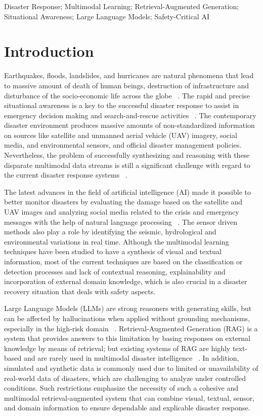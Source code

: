 \documentclass[conference]{IEEEtran}
\begin{document}
\begin{IEEEkeywords}
Disaster Response; Multimodal Learning; Retrieval-Augmented Generation; Situational Awareness; Large Language Models; Safety-Critical AI
\end{IEEEkeywords}

\section{Introduction}

Earthquakes, floods, landslides, and hurricanes are natural phenomena that lead to massive amount of death of human beings, destruction of infrastructure and disturbance of the socio-economic life across the globe ~\cite{b1}. The rapid and precise situational awareness is a key to the successful disaster response to assist in emergency decision making and search-and-rescue activities ~\cite{b2}. The contemporary disaster environment produces massive amounts of non-standardized information on sources like satellite and unmanned aerial vehicle (UAV) imagery, social media, and environmental sensors, and official disaster management policies. Nevertheless, the problem of successfully synthesizing and reasoning with these disparate multimodal data streams is still a significant challenge with regard to the current disaster response systems ~\cite{b3}.

The latest advances in the field of artificial intelligence (AI) made it possible to better monitor disasters by evaluating the damage based on the satellite and UAV images and analyzing social media related to the crisis and emergency messages with the help of natural language processing ~\cite{b4}. The sensor driven methods also play a role by identifying the seismic, hydrological and environmental variations in real time. Although the multimodal learning techniques have been studied to have a synthesis of visual and textual information, most of the current techniques are based on the classification or detection processes and lack of contextual reasoning, explainability and incorporation of external domain knowledge, which is also crucial in a disaster recovery situation that deals with safety aspects.

Large Language Models (LLMs) are strong reasoners with generating skills, but can be affected by hallucinations when applied without grounding mechanisms, especially in the high-risk domain ~\cite{b5}. Retrieval-Augmented Generation (RAG) is a system that provides answers to this limitation by basing responses on external knowledge by means of retrieval; but existing systems of RAG are highly text-based and are rarely used in multimodal disaster intelligence ~\cite{b6}. In addition, simulated and synthetic data is commonly used due to limited or unavailability of real-world data of disasters, which are challenging to analyze under controlled conditions. Such restrictions emphasize the necessity of such a cohesive and multimodal retrieval-augmented system that can combine visual, textual, sensor, and domain information to ensure dependable and explicable disaster response.
\end{document}
